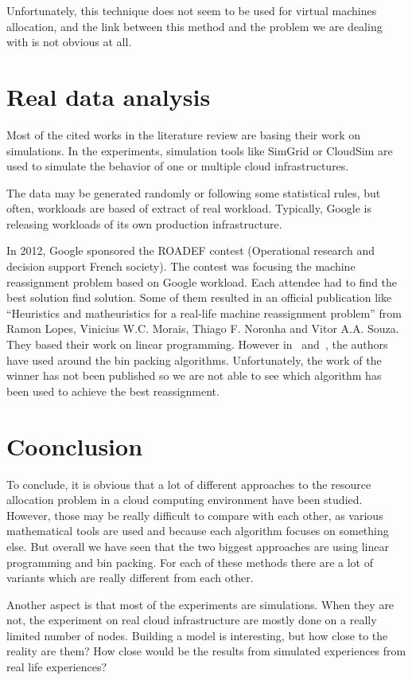 \documentclass[a4paper,11pt]{article}
\begin{document}
Unfortunately, this technique does not seem to be used for virtual machines
allocation, and the link between this method and the problem we are dealing
with is not obvious at all.

\section{Real data analysis}

Most of the cited works in the literature review are basing their work on
simulations.  In the experiments, simulation tools like
SimGrid\cite{website:simgrid} or CloudSim\cite{website:cloudsim} are used to simulate
the behavior of one or multiple cloud infrastructures.

The data may be generated randomly or following some statistical rules, but
often, workloads are based of extract of real workload. Typically, Google is
releasing workloads of its own production infrastructure. 

In 2012, Google sponsored the ROADEF contest (Operational research and decision
support French society)\cite{website:roadef}. The contest was focusing the machine
reassignment problem based on Google workload. Each attendee had to find the
best solution find solution. Some of them resulted in an official publication
like “Heuristics and matheuristics for a real-life machine reassignment
problem” from Ramon Lopes, Vinicius W.C. Morais, Thiago F. Noronha and Vitor
A.A. Souza\cite{roadef:ip}.  They based their work on linear programming.
However in~\cite{roadef:bp1} and~\cite{roadef:bp2}, the authors have used
around the bin packing algorithms. Unfortunately, the work of the winner has
not been published so we are not able to see which algorithm has been used to
achieve the best reassignment.

\section*{Coonclusion}

To conclude, it is obvious that a lot of different approaches to the resource
allocation problem in a cloud computing environment have been studied. However,
those may be really difficult to compare with each other, as various
mathematical tools are used and because each algorithm focuses on something
else. But overall we have seen that the two biggest approaches are using
linear programming and bin packing. For each of these methods there are
a lot of variants which are really different from each other.

Another aspect is that most of the experiments are simulations. When they
are not, the experiment on real cloud infrastructure are mostly done on a
really limited number of nodes. Building a model is interesting, but how close
to the reality are them? How close would be the results from simulated
experiences from real life experiences?

\nocite{*}


\end{document}
